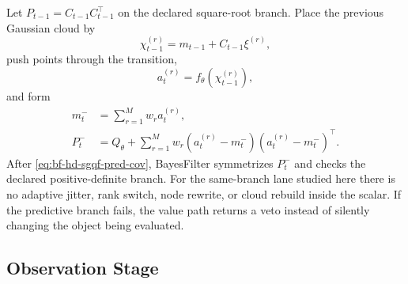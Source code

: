 Let \(P_{t-1}=C_{t-1}C_{t-1}^\top\) on the declared square-root branch.  Place
the previous Gaussian cloud by
\begin{equation}
  \chi_{t-1}^{(r)} = m_{t-1}+C_{t-1}\xi^{(r)},
  \label{eq:bf-hd-sgqf-pred-placed-points}
\end{equation}
push points through the transition,
\begin{equation}
  a_t^{(r)}=f_\theta(\chi_{t-1}^{(r)}),
  \label{eq:bf-hd-sgqf-transition-points}
\end{equation}
and form
\begin{align}
  m_t^-&=\sum_{r=1}^Mw_ra_t^{(r)},
  \label{eq:bf-hd-sgqf-pred-mean}\\
  P_t^-&=Q_\theta+\sum_{r=1}^Mw_r
  (a_t^{(r)}-m_t^-)(a_t^{(r)}-m_t^-)^\top.
  \label{eq:bf-hd-sgqf-pred-cov}
\end{align}
After \eqref{eq:bf-hd-sgqf-pred-cov}, BayesFilter symmetrizes \(P_t^-\) and
checks the declared positive-definite branch.  For the same-branch lane studied
here there is no adaptive jitter, rank switch, node rewrite, or cloud rebuild
inside the scalar.  If the predictive branch fails, the value path returns a
veto instead of silently changing the object being evaluated.

\subsection{Observation Stage}
\label{sec:bf-hd-sgqf-observation-stage}

